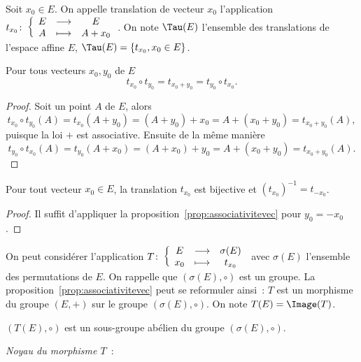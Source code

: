 \begin{defdef}
  Soit $x_0 \in E$. On appelle translation de vecteur $x_0$ l'application $t_{x_0}\colon \left\{\begin{array}{ccc} E & \longrightarrow &E\\ A & \longmapsto & A+x_0 \end{array} \right.$. On note $\Tau(E)$ l'ensemble des translations de l'espace affine $E$, $\Tau(E)=\{t_{x_0}, x_0 \in E\}$.
\end{defdef}

\begin{prop}\label{prop:associativitevec}
  Pour tous vecteurs $x_0, y_0$ de $E$
  \begin{equation}
    t_{x_0} \circ t_{y_0} = t_{x_0 +y_0} = t_{y_0} \circ t_{x_0}.
  \end{equation}
\end{prop}
\begin{proof}
  Soit un point $A$ de $E$, alors
  \begin{equation}
    t_{x_0} \circ t_{y_0} (A)=t_{x_0}(A+y_0) = (A+y_0)+x_0 = A+(x_0+y_0) =t_{x_0+y_0}(A),
  \end{equation}
  puisque la loi $+$ est associative. Ensuite de la même manière
  \begin{equation}
    t_{y_0} \circ t_{x_0} (A)=t_{y_0}(A+x_0) = (A+x_0)+y_0 = A+(x_0+y_0)=t_{x_0+y_0}(A).
  \end{equation}
\end{proof}

\begin{prop}
  Pour tout vecteur $x_0 \in E$, la translation $t_{x_0}$ est bijective et $(t_{x_0})^{-1}=t_{-x_0}$.
\end{prop}
\begin{proof}
  Il suffit d'appliquer la proposition~\ref{prop:associativitevec} pour $y_0=-x_0$.
\end{proof}

On peut considérer l'application $T\colon \left\{\begin{array}{ccc} E & \longrightarrow &\sigma(E)\\ x_0 & \longmapsto & t_{x_0} \end{array} \right.$ avec $\sigma(E)$ l'ensemble des permutations de $E$. On rappelle que $(\sigma(E),\circ)$ est un groupe. La proposition~\ref{prop:associativitevec} peut se reformuler ainsi~: $T$ est un morphisme du groupe $(E,+)$ sur le groupe $(\sigma(E),\circ)$. On note $T(E)=\Image(T)$.

\begin{prop}
  $(T(E),\circ)$ est un sous-groupe abélien du groupe $(\sigma(E),\circ)$.
\end{prop}

\emph{Noyau du morphisme $T$}~:

